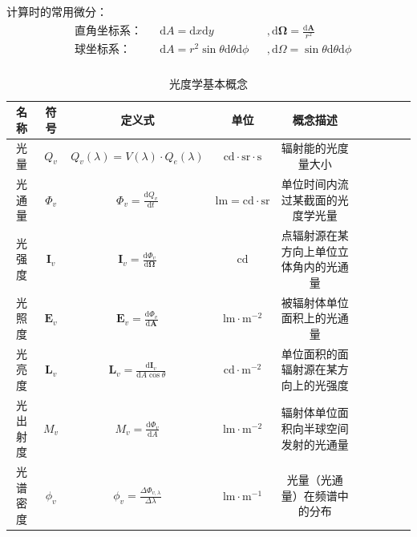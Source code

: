 \documentclass[UTF8]{report}
\theoremstyle{MyLineTheoremStyle} %
\theoremstyle{MyBlockTheoremStyle} %
\theoremstyle{MySubsubsectionStyle} %
\begin{document}
计算时的常用微分：
\begin{gather}
\begin{aligned}
    & \text{直角坐标系：}&& \mathrm{d}A = \mathrm{d}x \mathrm{d}y &&,  \mathrm{d}\boldsymbol{\Omega} = \frac{\mathrm{d}\boldsymbol{A}}{r^2} \\ 
    & \text{球坐标系：}&& \mathrm{d}A = r^2 \sin \theta \mathrm{d}\theta \mathrm{d}\phi &&,\mathrm{d}\Omega = \sin \theta \mathrm{d}\theta \mathrm{d}\phi \\ 
\end{aligned}
\end{gather}
\begin{table}[H]\centering
    \caption{光度学基本概念}\label{光度学基本概念表}
    \renewcommand{\arraystretch}{1.15} %
\begin{tabular}{|c|c|c|c|c|c|c|c|c|c|}\hline
    名称 & 符号& 定义式 & 单位 & 概念描述\\
    \hline
    光量 & $Q_v$ & $Q_v(\lambda) = V(\lambda)\cdot Q_e(\lambda)$ & $\mathrm{cd \cdot sr \cdot s}$ & 辐射能的光度量大小 \\
    \hline
    光通量 & $\Phi_v$ & $\Phi_v = \frac{\mathrm{d}Q_v}{\mathrm{d}t}$ & $\mathrm{lm} = \mathrm{cd \cdot sr}$ & 单位时间内流过某截面的光度学光量 \\
    \hline
    光强度 & $\boldsymbol{I}_v$ & $\boldsymbol{I}_v = \frac{\mathrm{d}\Phi_v }{\mathrm{d} \boldsymbol{\Omega} } $ & $\mathrm{cd}$ & 点辐射源在某方向上单位立体角内的光通量 \\
    \hline
    光照度 & $\boldsymbol{E}_v$ & $ \boldsymbol{E}_v = \frac{\mathrm{d}\Phi_v}{\mathrm{d}\boldsymbol{A}}$ & $\mathrm{lm \cdot m^{-2}}$ & 被辐射体单位面积上的光通量 \\
    \hline
    光亮度 & $\boldsymbol{L}_v$ & $\boldsymbol{L}_v = \frac{\mathrm{d}\boldsymbol{I}_v}{\mathrm{d}A \cos \theta} $ & $\mathrm{cd \cdot m^{-2}}$ & 单位面积的面辐射源在某方向上的光强度 \\
    \hline
    光出射度 & $M_v$ & $ M_v = \frac{\mathrm{d}\Phi_v}{\mathrm{d}A}$ & $\mathrm{lm \cdot m^{-2}} $ & 辐射体单位面积向半球空间发射的光通量 \\
    \hline
    光谱密度 & $\phi_v$ & $\phi_v = \frac{\Delta \Phi_{v,\lambda}}{ \Delta\lambda} $ & $\mathrm{lm \cdot m^{-1}}$ & 光量（光通量）在频谱中的分布 \\
    \hline
\end{tabular}
\end{table}
\end{document}
